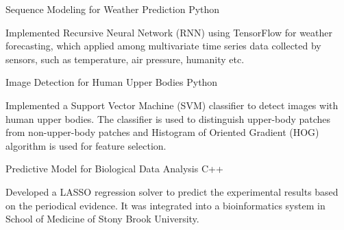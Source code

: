 \begin{cventries}

\projentry
{Sequence Modeling for Weather Prediction} %
{Python} %
{ %
\begin{cvitems}
\item{Implemented Recursive Neural Network ({RNN}) using TensorFlow for weather forecasting, which applied among multivariate time series data collected by sensors, such as temperature, air pressure, humanity etc.}
\end{cvitems}
}


\projentry
{Image Detection for Human Upper Bodies} %
{Python} %
{
\begin{cvitems}
\item{Implemented a Support Vector Machine ({SVM}) classifier to detect images with human upper bodies. The classifier is used to distinguish upper-body patches from non-upper-body patches and Histogram of Oriented Gradient (HOG) algorithm is used for feature selection.}
\end{cvitems}
}




\projentry
{Predictive Model for Biological Data Analysis} %
{C++} %
{ %
\begin{cvitems}
\item{Developed a LASSO regression solver to predict the experimental results based on the periodical evidence. It was integrated into a bioinformatics system in School of Medicine of Stony Brook University.}
\end{cvitems}
}




\end{cventries}
